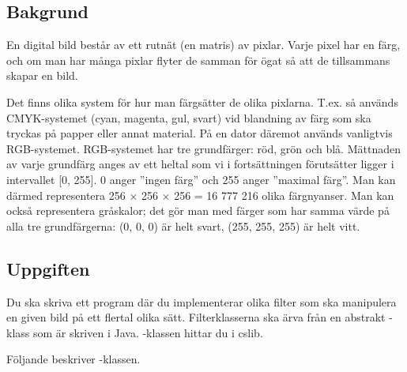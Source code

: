 

\subsection{Bakgrund}

En digital bild består av ett rutnät (en matris) av pixlar. Varje pixel har en färg, och om man har många pixlar flyter de samman för ögat så att de tillsammans skapar en bild.

Det finns olika system för hur man färgsätter de olika pixlarna. T.ex. så används CMYK-systemet (cyan, magenta, gul, svart) vid blandning av färg som ska tryckas på papper eller annat material. På en dator däremot används vanligtvis RGB-systemet. RGB-systemet har tre grundfärger: röd, grön och blå. Mättnaden av varje grundfärg anges av ett heltal som vi i fortsättningen förutsätter ligger i intervallet [0, 255]. 0 anger ”ingen färg” och 255 anger ”maximal färg”. Man kan därmed representera 256 × 256 × 256 = 16 777 216 olika färgnyanser. Man kan också representera gråskalor; det gör man med färger som har samma värde på alla tre grundfärgerna: (0, 0, 0) är helt svart, (255, 255, 255) är helt vitt.


\subsection{Uppgiften}
Du ska skriva ett program där du implementerar olika filter som ska manipulera en given bild på ett flertal olika sätt. Filterklasserna ska ärva från en abstrakt -klass som är skriven i Java. -klassen hittar du i cslib.

Följande beskriver -klassen.

